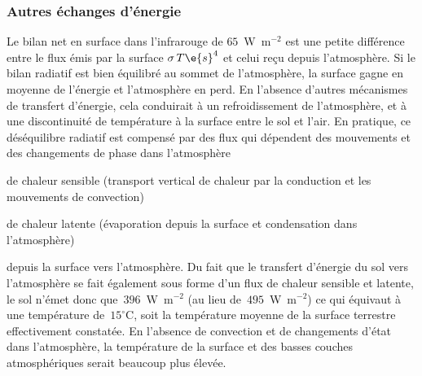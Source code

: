 \sk
\subsubsection{Autres échanges d'énergie}

\sk
Le bilan net en surface dans l'infrarouge de $65$~W~m$^{-2}$ est une petite différence entre le flux émis par la surface $\sigma \, {T\e{s}}^4$ et celui reçu depuis l'atmosphère. Si le bilan radiatif est bien équilibré au sommet de l'atmosphère, la surface gagne en moyenne de l'énergie et l'atmosphère en perd. En l'absence d'autres mécanismes de transfert d'énergie, cela conduirait à un refroidissement de l'atmosphère, et à une discontinuité de température à la surface entre le sol et l'air. En pratique, ce déséquilibre radiatif est compensé par des flux qui dépendent des mouvements et des changements de phase dans l'atmosphère
\begin{citemize}
\item de chaleur sensible (transport vertical de chaleur par la conduction et les mouvements de convection) 
\item de chaleur latente (évaporation depuis la surface et condensation dans l'atmosphère) 
\end{citemize}
depuis la surface vers l'atmosphère. Du fait que le transfert d'énergie du sol vers l'atmosphère se fait également sous forme d'un flux de chaleur sensible et latente, le sol n'émet donc que~$396$~W~m$^{-2}$ (au lieu de~$495$~W~m$^{-2}$) ce qui équivaut à une température de~$15^{\circ}$C, soit la température moyenne de la surface terrestre effectivement constatée. En l'absence de convection et de changements d'état dans l'atmosphère, la température de la surface et des basses couches atmosphériques serait beaucoup plus élevée. 



